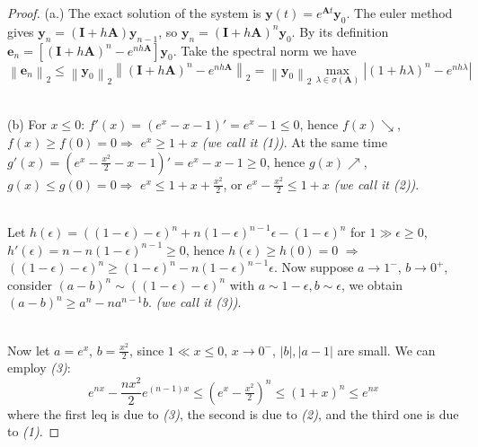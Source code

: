 \documentclass[a4paper, 10pt]{article}
\theoremstyle{definition}
\theoremstyle{hSol}
\begin{document}
\begin{proof} (a.) The exact solution of the system is $\bm{y}(t)=e^{\bm{A}t}\bm{y}_0$. The euler method gives $\bm{y}_n = (\bm{I} + h \bm{A}) \bm{y}_{n-1}$, so $\bm{y}_n = (\bm{I}+h \bm{A})^n \bm{y}_0$. By its definition $\bm{e}_n = [(\bm{I}+h \bm{A})^n - e^{nh\bm{A}}] \bm{y}_0$. Take the spectral norm we have
\begin{equation}
  \left\|\bm{e}_n\right\|_2 \leq \left\|\bm{y}_0\right\|_2 \left\|(\bm{I}+h \bm{A})^n - e^{nh\bm{A}}\right\|_2 = \left\|\bm{y}_0\right\|_2 \max\limits_{\lambda\in \sigma(\bm{A})}\left|(1+h \lambda)^n - e^{nh \lambda}\right|
\end{equation}

~\\
(b) For $x\leq 0$: $f'(x)=(e^x-x-1)'=e^x-1\leq 0$, hence $f(x) \searrow$, $f(x) \geq f(0)=0 \Rightarrow $ $e^x\geq 1+x$ \emph{(we call it (1))}. At the same time $g'(x)=(e^x-\frac{x^2}{2}-x-1)'=e^x-x-1\geq 0$, hence $g(x) \nearrow$, $g(x) \leq g(0)=0 \Rightarrow $ $e^x\leq 1+x+\frac{x^2}{2}$, or $e^x -\frac{x^2}{2}\leq 1+x$ \emph{(we call it (2))}.

~\\
Let $h(\epsilon) = ((1-\epsilon)- \epsilon)^n + n (1- \epsilon)^{n-1}\epsilon - (1- \epsilon)^n$ for $1\gg \epsilon \geq 0$, $h'(\epsilon)=n-n(1- \epsilon)^{n-1}\geq 0$, hence $h(\epsilon) \geq h(0) = 0$ $\Rightarrow$ $((1-\epsilon)- \epsilon)^n \geq (1- \epsilon)^n-n (1- \epsilon)^{n-1}\epsilon$. Now suppose $a\to 1^-$, $b\to 0^+$, consider $(a-b)^n\sim ((1-\epsilon)- \epsilon)^n$ with $a\sim 1-\epsilon, b\sim \epsilon$, we obtain $(a-b)^n \geq a^n -na^{n-1}b$. \emph{(we call it (3))}.

~\\
Now let $a=e^x$, $b=\frac{x^2}{2}$, since $1 \ll x \leq 0$, $x\to 0^{-}$, $|b|, |a-1|$ are small. We can employ \emph{(3)}: 
$$
e^{nx}-\frac{nx^2}{2}e^{(n-1)x}\leq (e^x - \tfrac{x^2}{2})^n \leq (1+x)^n \leq e^{nx}
$$
where the first leq is due to \emph{(3)}, the second is due to \emph{(2)}, and the third one is due to \emph{(1)}.


\end{proof}
\end{document}
